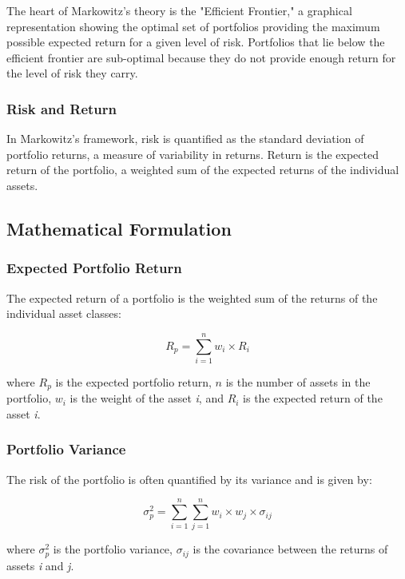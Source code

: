 \documentclass{article}
\begin{document}
The heart of Markowitz's theory is the "Efficient Frontier," a graphical representation showing the optimal set of portfolios providing the maximum possible expected return for a given level of risk. Portfolios that lie below the efficient frontier are sub-optimal because they do not provide enough return for the level of risk they carry.

\subsubsection*{Risk and Return}

In Markowitz's framework, risk is quantified as the standard deviation of portfolio returns, a measure of variability in returns. Return is the expected return of the portfolio, a weighted sum of the expected returns of the individual assets.

\subsection{Mathematical Formulation}

\subsubsection*{Expected Portfolio Return}

The expected return of a portfolio is the weighted sum of the returns of the individual asset classes:

\begin{equation}
R_p = \sum_{i=1}^{n} w_i \times R_i
\end{equation}

where \( R_p \) is the expected portfolio return, \( n \) is the number of assets in the portfolio, \( w_i \) is the weight of the asset \textit{i}, and \( R_i \) is the expected return of the asset \textit{i}.

\subsubsection*{Portfolio Variance}

The risk of the portfolio is often quantified by its variance and is given by:

\begin{equation}
\sigma_p^2 = \sum_{i=1}^{n} \sum_{j=1}^{n} w_i \times w_j \times \sigma_{ij}
\end{equation}

where \( \sigma_p^2 \) is the portfolio variance, \( \sigma_{ij} \) is the covariance between the returns of assets \textit{i} and \textit{j}.
\end{document}
